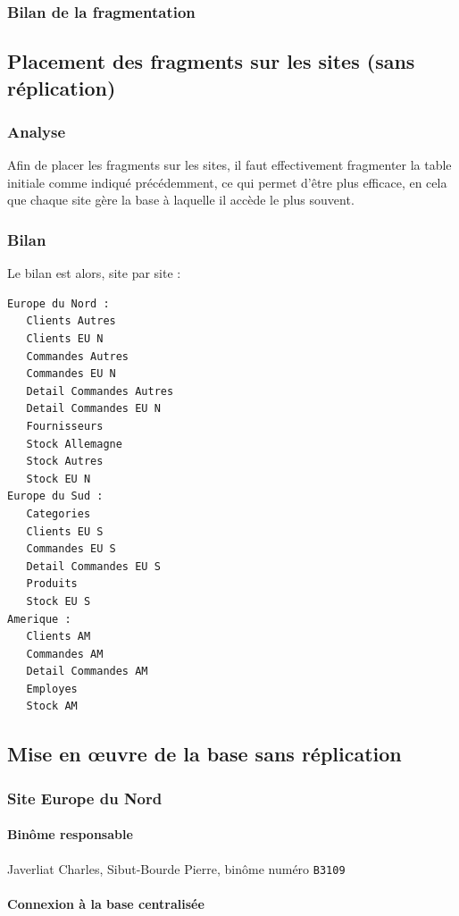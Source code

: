 \documentclass[10pt,a4paper]{article}
\theoremstyle{plain}
\begin{document}
\subsubsection{Bilan de la fragmentation}

\subsection{Placement des fragments sur les sites (sans réplication)}
\subsubsection{Analyse}
Afin de placer les fragments sur les sites, il faut effectivement fragmenter la table initiale comme indiqué précédemment, ce qui permet d'être plus efficace, en cela que chaque site gère la base à laquelle il accède le plus souvent. 

\subsubsection{Bilan}
Le bilan est alors, site par site :
\begin{verbatim}
Europe du Nord :
   Clients Autres
   Clients EU N
   Commandes Autres
   Commandes EU N
   Detail Commandes Autres
   Detail Commandes EU N
   Fournisseurs
   Stock Allemagne
   Stock Autres
   Stock EU N
Europe du Sud :
   Categories
   Clients EU S
   Commandes EU S
   Detail Commandes EU S
   Produits
   Stock EU S
Amerique :
   Clients AM
   Commandes AM
   Detail Commandes AM
   Employes
   Stock AM
\end{verbatim}

\newpage
\subsection{Mise en \oe uvre de la base sans réplication}
\subsubsection{Site Europe du Nord}

\paragraph{Binôme responsable}

Javerliat Charles, Sibut-Bourde Pierre, binôme numéro \verb|B3109|

\paragraph{Connexion à la base centralisée}
\end{document}

